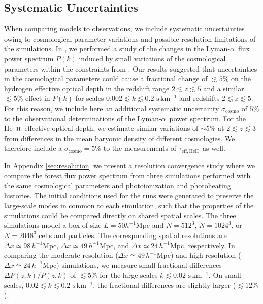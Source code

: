 \documentclass[twocolumn]{aastex62}
\newcommand\Lya{Lyman-$\alpha$}
\def\HeII{\hbox{He~$\scriptstyle\rm II$}}
\newcommand\taueffHe{$\tau_{\mathrm{eff,HeII}}$~}
\begin{document}
\subsection{Systematic Uncertainties}
\label{sec:sys_errors}

When comparing models to observations, we include
systematic uncertainties owing to cosmological parameter variations
and possible resolution limitations of the simulations.
In \cite{villasenor2021a}, we performed a study of the changes in the \Lya\ flux power spectrum $P(k)$ 
induced by small variations of the cosmological parameters within the constraints from \cite{Planck_collaboration_2020}. 
Our results suggested that 
uncertainties in the cosmological parameters could
cause a fractional change 
of $\lesssim 5\%$ on the hydrogen effective optical depth in the redshift range $2 \lesssim z \lesssim 5$ and a similar $\lesssim 5\%$ effect in $P(k)$ for scales 
$0.002 \lesssim k \lesssim 0.2 \,\, \mathrm{ s \, km^{-1}}$ and redshifts $2 \lesssim z \lesssim 5$. 
For this reason, we include here an additional systematic uncertainty 
$\sigma_{\mathrm{cosmo}}$ of $5\%$ to 
the observational determinations of the \Lya\ power spectrum.  
For the \HeII\ effective optical depth, we estimate similar variations of $\sim 5\%$ at  $2 \lesssim z \lesssim 3$ from 
differences in the mean baryonic density of different cosmologies.  We therefore include a $\sigma_{\mathrm{cosmo}} = 5\% $ to the measurements of \taueffHe as well.      
         
In Appendix \ref{sec:resolution} we present a resolution convergence study where we compare the forest flux power spectrum from three simulations performed with the same cosmological 
parameters and photoionization and photoheating histories.
The initial conditions used for the runs were generated to preserve the large-scale modes in common to each 
simulation, such that the properties of the simulations could be compared directly on shared spatial scales. The three simulations 
model
a box of size $L= 50 h^{-1}$Mpc 
and
$N=512^3$, $N=1024^3$, or
 $N=2048^3$ cells and particles.
The corresponding spatial resolutions are $\Delta x \simeq 98 \,h^{-1}$Mpc, 
$\Delta x \simeq 49 \,h^{-1}$Mpc, and $\Delta x \simeq 24 \,h^{-1}$Mpc, respectively.
In comparing the moderate resolution ($\Delta x \simeq 49 \,h^{-1}$Mpc) 
and high resolution ($\Delta x \simeq 24 \,h^{-1}$Mpc) simulations,
we measure small fractional differences $\Delta P(z,k) / P(z,k)$ of $\lesssim 5\%$ for the 
large scales $k \lesssim 0.02 \,\, \mathrm{s\, km^{-1}}$.
On small scales, $ 0.02 \lesssim k \lesssim 0.2 \,\, \mathrm{s\, km^{-1}}$, the fractional differences are 
slightly larger ($\lesssim 12\%$).  
\end{document}
